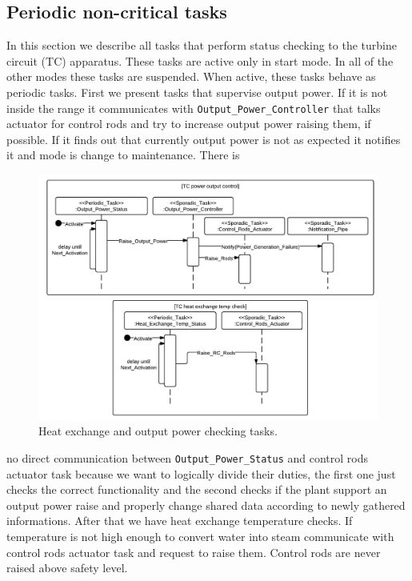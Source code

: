 \documentclass[10pt,a4paper]{report}
\begin{document}
\subsection{Periodic non-critical tasks}
In this section we describe all tasks that perform status checking to the
turbine circuit (TC) apparatus. These tasks are active only in start mode. 
In all of the other modes these tasks are suspended. When active, these tasks
behave as periodic tasks.
First we present tasks that supervise output power. If it is not inside the 
range it communicates with \texttt{Output\_Power\_Controller} that talks 
actuator for control rods and try to increase output power raising them, if possible. 
If it finds out that currently output power is not as expected it notifies it 
and mode is change to maintenance. There is
\begin{figure}[h!tb]
\centering
\includegraphics[width=\textwidth]{diagrams/TC_Status_Diagram1}
\caption{Heat exchange and output power checking tasks.}
\end{figure}
no direct communication between \texttt{Output\_Power\_Status} and control 
rods actuator task because we want to logically divide their duties, the first 
one just checks the correct functionality and the second checks if the plant 
support an output power raise and properly change shared data according to 
newly gathered informations. After that we have heat exchange temperature checks. 
If temperature is not high enough to convert water into steam communicate with 
control rods actuator task and request to raise them. Control rods are never 
raised above safety level. 
\end{document}
